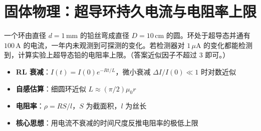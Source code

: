 \section{固体物理：超导环持久电流与电阻率上限}
\label{sec:persistent-current}

\begin{modelbox}[题目：持久电流实验估计超导电阻率]
一个环由直径 $d=1\,\text{mm}$ 的铅丝弯成直径 $D=10\,\text{cm}$ 的圆。环处于超导态并通有 $100\,\text{A}$ 的电流，一年内未观测到可探测的变化。若检测器对 $1\,\mu\text{A}$ 的变化都能检测到，计算实验上超导态铅的电阻率上限。（答案近似因子不超过 3 即可。）
\end{modelbox}

\begin{tipbox}[考点快速分析]
\begin{itemize}
    \item \textbf{RL 衰减}：$I(t)=I(0)e^{-Rt/L}$，微小衰减 $\Delta I/I(0)\ll1$ 时对数近似
    \item \textbf{自感估算}：细圆环近似 $L\approx(\pi/2)\mu_0r$
    \item \textbf{电阻率}：$\rho=RS/l$，$S$ 为截面积，$l$ 为丝长
    \item \textbf{核心思想}：用电流不衰减的时间尺度反推电阻率的极低上限
\end{itemize}
\end{tipbox}

